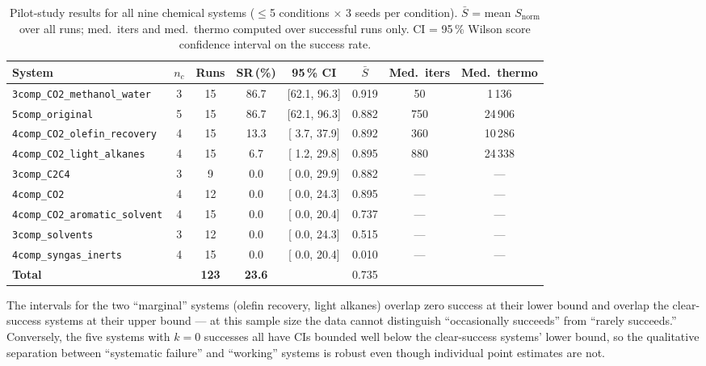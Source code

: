\documentclass[11pt,a4paper]{article}
\theoremstyle{definition}
\theoremstyle{plain}
\begin{document}
\begin{table}[ht]
\centering
\caption{Pilot-study results for all nine chemical systems ($\leq$5 conditions $\times$ 3 seeds per condition). $\bar{S}$ = mean $S_{\mathrm{norm}}$ over all runs; med.\ iters and med.\ thermo computed over successful runs only. CI = 95\,\% Wilson score confidence interval on the success rate.}
\label{tab:all_results}
\small
\begin{tabular}{@{}p{4.8cm}ccccccc@{}}
\toprule
System & $n_c$ & Runs & SR\,(\%) & 95\,\% CI & $\bar{S}$ &
 Med.\ iters & Med.\ thermo \\
\midrule
\texttt{3comp\_CO2\_methanol\_water} & 3 & 15 & 86.7 & [62.1, 96.3] & 0.919 &   50 & 1\,136 \\
\texttt{5comp\_original}       & 5 & 15 & 86.7 & [62.1, 96.3] & 0.882 &  750 & 24\,906 \\
\texttt{4comp\_CO2\_olefin\_recovery}& 4 & 15 & 13.3 & [ 3.7, 37.9] & 0.892 &  360 & 10\,286 \\
\texttt{4comp\_CO2\_light\_alkanes} & 4 & 15 & 6.7 & [ 1.2, 29.8] & 0.895 &  880 & 24\,338 \\
\texttt{3comp\_C2C4}         & 3 & 9 & 0.0 & [ 0.0, 29.9] & 0.882 &  --- &  --- \\
\texttt{4comp\_CO2}         & 4 & 12 & 0.0 & [ 0.0, 24.3] & 0.895 &  --- &  --- \\
\texttt{4comp\_CO2\_aromatic\_solvent}& 4 & 15 & 0.0 & [ 0.0, 20.4] & 0.737 &  --- &  --- \\
\texttt{3comp\_solvents}       & 3 & 12 & 0.0 & [ 0.0, 24.3] & 0.515 &  --- &  --- \\
\texttt{4comp\_syngas\_inerts}    & 4 & 15 & 0.0 & [ 0.0, 20.4] & 0.010 &  --- &  --- \\
\midrule
\textbf{Total}            & & \textbf{123} & \textbf{23.6} & & 0.735 & & \\
\bottomrule
\end{tabular}
\normalsize
\end{table}

The intervals for the two ``marginal'' systems (olefin recovery, light alkanes) overlap zero success at their lower bound and overlap the clear-success systems at their upper bound — at this sample size the data cannot distinguish ``occasionally succeeds'' from ``rarely succeeds.'' Conversely, the five systems with $k=0$ successes all have CIs bounded well below the clear-success systems' lower bound, so the qualitative separation between ``systematic failure'' and ``working'' systems is robust even though individual point estimates are not.
\end{document}
